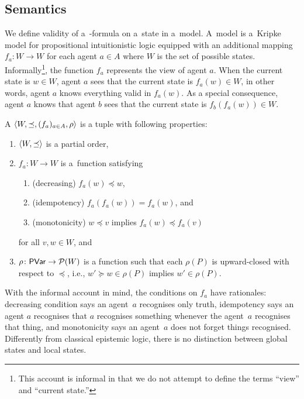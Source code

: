   \subsection{Semantics}
  We define validity of a~\iec-formula on a~state in a~model.
  A~model is a~Kripke model for propositional intuitionistic logic
  equipped with an additional
  mapping $f_a: W\rightarrow W$ for each agent $a\in A$ where $W$ is the
  set of possible states.
  Informally\footnote{This account is informal in that we do not attempt to
  define the terms ``view'' and ``current state.''},
  the function $f_a$ represents the view of agent
  $a$.
  When the current state is $w\in W$\kern -2pt, agent $a$ sees that the current state is
  $f_a(w)\in W$, in other words, agent $a$ knows everything valid in $f_a(w)$.
  As a special consequence, agent $a$ knows that agent $b$ sees that the current state
  is
  $f_b(f_a(w))\in W$\kern -2pt.

  \newcommand{\model}[1]{\tuple{W#1, \preceq#1, (f_a#1)_{a\in A}, \rho#1}}
  \begin{definition}
   \label{model}
   A  $\langle{W,\preceq, (f_a)_{a\in A}, \rho}\rangle$ is a tuple with following properties:
   \begin{enumerate}
    \item $\langle{W,\preceq}\rangle$ is a partial order,
    \item $f_a\colon W\rightarrow W$ is a~function satisfying
	  \begin{enumerate}
	   \item (decreasing) $f_a(w) \preceq w$,
	   \item (idempotency) $f_a(f_a(w)) = f_a(w)$, and
	   \item (monotonicity) $w\preceq v$ implies $f_a(w)\preceq f_a(v)$
	  \end{enumerate}
	  for all $v,w\in W$, and
    \item $\rho\colon \mathsf{PVar}\rightarrow {\mathcal P({W})}$ is a function such that each $\rho(P)$ is
	  upward-closed with respect to $\preceq$, i.e., $w'\succeq w\in\rho(P)$ implies
	  $w'\in\rho(P)$.
   \end{enumerate}
  \end{definition}
  \noindent With the informal account in mind, the conditions on $f_a$ have rationales:
  decreasing condition says an agent~$a$ recognises only truth,
  idempotency says an agent $a$ recognises that
       $a$ recognises something whenever the agent~$a$ recognises that thing,
       and monotonicity says an agent~$a$ does not forget things recognised.
       Differently from classical epistemic logic,
       there is no distinction between global states and local states.

